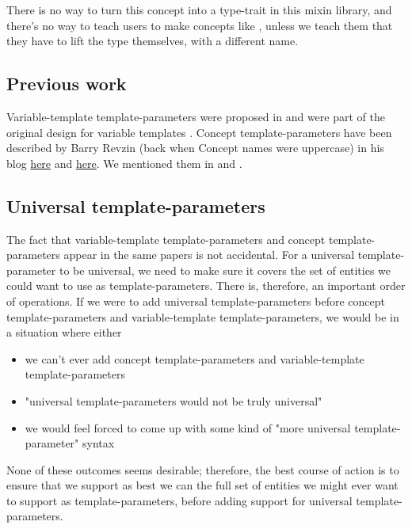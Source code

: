 \documentclass{wg21}
\begin{document}
There is no way to turn this concept into a type-trait in this mixin library, and there's no way to teach users to make concepts like ,
unless we teach them that they have to lift the type themselves, with a different name.

\subsection{Previous work}

Variable-template template-parameters were proposed in  and were part of the original design for variable templates .
Concept template-parameters have been described by Barry Revzin (back when Concept names were uppercase) in his blog \href{https://brevzin.github.io/c++/2019/01/09/concept-templates/}{here} and \href{https://brevzin.github.io/c++/2019/03/24/concept-templates-2/}{here}.
We mentioned them in  and .

\subsection{Universal template-parameters}

The fact that variable-template template-parameters and concept template-parameters appear in the same papers is not accidental.
For a universal template-parameter to be universal, we need to make sure it covers the set of entities we could want to use as template-parameters.
There is, therefore, an important order of operations.
If we were to add universal template-parameters before concept template-parameters and variable-template template-parameters, we would be in a situation where either
\begin{itemize}
\item we can't ever add concept template-parameters and variable-template template-parameters
\item "universal template-parameters would not be truly universal"
\item we would feel forced to come up with some kind of "more universal template-parameter" syntax
\end{itemize}

None of these outcomes seems desirable; therefore, the best course of action is to ensure that we
support as best we can the full set of entities we might ever want to support as template-parameters, before adding support for universal template-parameters.
\end{document}
